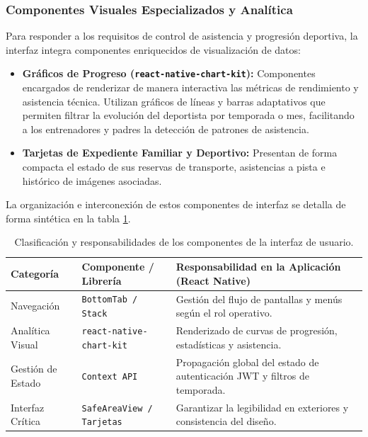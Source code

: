         \subsubsection{Componentes Visuales Especializados y Analítica}
        Para responder a los requisitos de control de asistencia y progresión deportiva, la interfaz integra componentes enriquecidos de visualización de datos:
        \begin{itemize}
            \item \textbf{Gráficos de Progreso (\texttt{react-native-chart-kit}):} Componentes encargados de renderizar de manera interactiva las métricas de rendimiento y asistencia técnica. Utilizan gráficos de líneas y barras adaptativos que permiten filtrar la evolución del deportista por temporada o mes, facilitando a los entrenadores y padres la detección de patrones de asistencia.
            \item \textbf{Tarjetas de Expediente Familiar y Deportivo:} Presentan de forma compacta el estado de sus reservas de transporte, asistencias a pista e histórico de imágenes asociadas.
        \end{itemize}

        La organización e interconexión de estos componentes de interfaz se detalla de forma sintética en la tabla \ref{tab:componentes_ui}.

        \begin{table}[htbp]
        \centering
        \scriptsize
        \renewcommand{\arraystretch}{1.3}
        \setlength{\tabcolsep}{6pt}
        \begin{tabularx}{\textwidth}{|l|l|X|}
        \hline
        \rowcolor[HTML]{EFEFEF} 
        \textbf{Categoría} & \textbf{Componente / Librería} & \textbf{Responsabilidad en la Aplicación (React Native)} \\ \hline
        Navegación & \texttt{BottomTab / Stack} & Gestión del flujo de pantallas y menús según el rol operativo. \\ \hline
        Analítica Visual & \texttt{react-native-chart-kit} & Renderizado de curvas de progresión, estadísticas y asistencia. \\ \hline
        Gestión de Estado & \texttt{Context API} & Propagación global del estado de autenticación JWT y filtros de temporada. \\ \hline
        Interfaz Crítica & \texttt{SafeAreaView / Tarjetas} & Garantizar la legibilidad en exteriores y consistencia del diseño. \\ \hline
        \end{tabularx}
        \caption{Clasificación y responsabilidades de los componentes de la interfaz de usuario.}
        \label{tab:componentes_ui}
        \end{table}